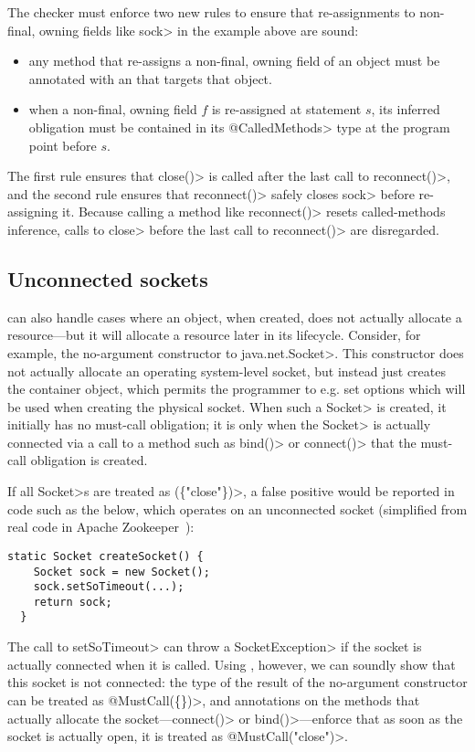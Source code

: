 The checker must enforce two new rules to ensure that
re-assignments to non-final, owning fields like \<sock> in the example
above are sound:
\begin{itemize}
\item any method that re-assigns a non-final, owning field of an object
  must be annotated with an \ResetMustCall that targets that object.
\item when a non-final, owning field $f$ is re-assigned at statement $s$,
  its inferred \MustCall obligation must be contained in its \<@CalledMethods>
  type at the program point before $s$.
\end{itemize}
\noindent
The first rule ensures that \<close()> is called after the last call
to \<reconnect()>, and the second rule ensures that \<reconnect()>
safely closes \<sock> before re-assigning it. Because calling
a \ResetMustCall method like \<reconnect()> resets called-methods
inference, calls to \<close> before the last call to \<reconnect()>
are disregarded.

\subsection{Unconnected sockets}
\label{sec:unconnected-sockets}
\ResetMustCall can also handle cases where an object, when created,
does not actually allocate a resource---but it will allocate a resource
later in its lifecycle. Consider, for example, the no-argument constructor
to \<java.net.Socket>. This constructor does not actually allocate an
operating system-level socket, but instead just creates the container
object, which permits the programmer to e.g. set options which will be used
when creating the physical socket. When such a \<Socket> is created, it
initially has no must-call obligation; it is only when the \<Socket> is
actually connected via a call to a method such as \<bind()>
or \<connect()> that the must-call obligation is created.

If all \<Socket>s are treated as \MustCall\<(\{"close"\})>,
a false positive would be reported
in code such as the below, which operates on an unconnected socket
(simplified from real code in Apache Zookeeper~):

\begin{lstlisting}[frame=tb,belowskip=3mm]
  static Socket createSocket() {
    Socket sock = new Socket();
    sock.setSoTimeout(...);
    return sock;
  }
\end{lstlisting}

The call to \<setSoTimeout> can throw a \<SocketException> if the
socket is actually connected when it is called. Using \ResetMustCall,
however, we can soundly show that this socket is not connected:
the type of the result of the no-argument constructor can be
treated as \<@MustCall(\{\})>, and \ResetMustCall annotations
on the methods that actually allocate the socket---\<connect()> or
\<bind()>---enforce that as soon as the socket is actually open,
it is treated as \<@MustCall("close")>.

